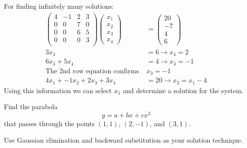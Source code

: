 \documentclass[12pts, answers]{exam}
\begin{document}
\begin{questions}
\begin{solution}
\begin{parts}
For finding infinitely many solutions:
%
\renewcommand{\caa}{4}
\renewcommand{\cab}{-1}
\renewcommand{\cac}{2}
\renewcommand{\cad}{3}
\renewcommand{\cba}{0}
\renewcommand{\cbb}{0}
\renewcommand{\cbc}{7}
\renewcommand{\cbd}{0}
\renewcommand{\cca}{0}
\renewcommand{\ccb}{0}
\renewcommand{\ccc}{6}
\renewcommand{\ccd}{5}
\renewcommand{\cda}{0}
\renewcommand{\cdb}{0}
\renewcommand{\cdc}{0}
\renewcommand{\cdd}{3}
\newcommand{\ba}{20}
\newcommand{\bb}{-7}
\newcommand{\bc}{4}
\newcommand{\bd}{6}
%
\begin{align}
\begin{pmatrix}
  \caa & \cab & \cac & \cad \\
  \cba & \cbb & \cbc & \cbd \\
  \cca & \ccb & \ccc & \ccd \\
  \cda & \cdb & \cdc & \cdd \\
\end{pmatrix} 
\begin{pmatrix} x_1 \\ x_2 \\ x_3 \\ x_4 \end{pmatrix} &= 
\begin{pmatrix} \ba \\ \bb  \\ \bc \\ \bd \end{pmatrix} \nonumber \\
%
\cdd x_4 &= \bd \rightarrow \boxed{x_4 = 2} \nonumber \\
%
\ccc x_3 + \ccd x_4 &= \bc \rightarrow \boxed{x_3 = -1} \nonumber \\
%
\text{The 2nd row equation confirms } &x_3 = -1 \nonumber \\
%
\caa x_1 + \cab x_2 + \cac x_3 + \cad x_4 &= \ba \rightarrow \boxed{x_2 = x_1 - 4} \nonumber
\end{align}
%
Using this information we can select $x_1$ and determine a solution for the system. 
\end{parts}
\end{solution}



\vspace*{3em}
\addpoints
\question[10] Find the parabola
\[ y = a + bx + cx^2\]
that passes through the points $(1,1)$, $(2,-1)$, and $(3,1)$. 

Use Gaussian elimination and backward substitution as your solution technique.


\end{questions}
\end{document}
